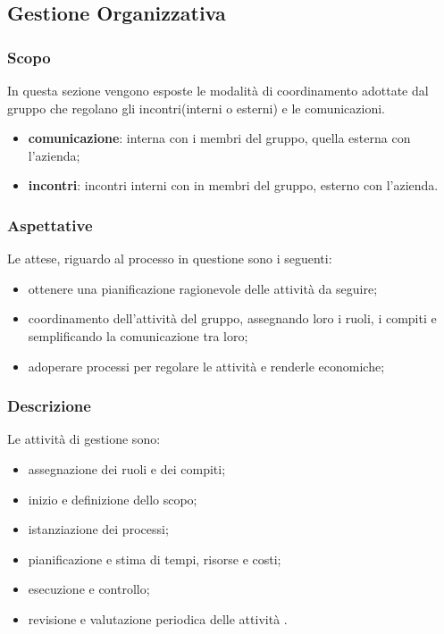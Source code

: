 \subsection{Gestione Organizzativa}
\subsubsection{Scopo}
In questa sezione vengono esposte le modalità  di coordinamento adottate dal gruppo che regolano gli incontri(interni o esterni) e le comunicazioni.
\begin{itemize}
\item \textbf{comunicazione}: interna con i membri del gruppo, quella esterna con l'azienda;
\item \textbf{incontri}: incontri interni con in membri del gruppo, esterno con l'azienda.

\end{itemize}
\subsubsection{Aspettative}
Le attese, riguardo al processo in questione sono i seguenti: 
\begin{itemize}
\item ottenere una pianificazione ragionevole delle attività da seguire;
\item coordinamento dell'attività  del gruppo, assegnando loro i ruoli, i compiti e semplificando la comunicazione tra loro;
\item adoperare processi per regolare le attività  e renderle economiche;

\end{itemize}

\subsubsection{Descrizione}
Le attività  di gestione sono: 
\begin{itemize}
\item assegnazione dei ruoli e dei compiti;
\item inizio e definizione dello scopo;
\item istanziazione dei processi;
\item pianificazione e stima di tempi, risorse e costi;
\item esecuzione e controllo;
\item revisione e valutazione periodica delle attività .
\end{itemize}

